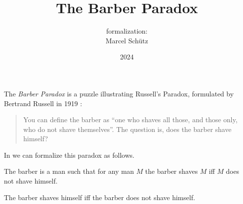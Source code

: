 \documentclass{article}
\title{The Barber Paradox}
\author{\Naproche formalization:\\[0.5em]Marcel Schütz}
\date{2024}
\begin{document}
  \maketitle


  \noindent The \emph{Barber Paradox} is a puzzle illustrating Russell's
  Paradox, formulated by Bertrand Russell in 1919 \cite[p. 355]{Russell1919}:

  \begin{quotation}
    \noindent You can define the barber as ``one who shaves all those, and 
    those only, who do not shave themselves''.
    The question is, does the barber shave himself?
  \end{quotation}
  
  \noindent In \Naproche we can formalize this paradox as follows.

  \begin{forthel}
    \begin{signature*}
      The barber is a man such that for any man $M$ the barber shaves $M$ iff $M$ does not shave himself.
    \end{signature*}
    
    \begin{theorem*}[title=Barber Paradox,id=barber_paradox]
      The barber shaves himself iff the barber does not shave himself.
    \end{theorem*}
  \end{forthel}

  \printbibliography
\end{document}
